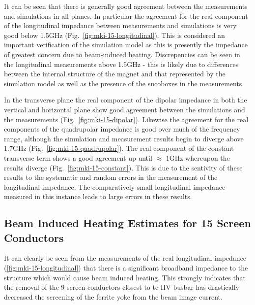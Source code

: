 It can be seen that there is generally good agreement between the measurements and simulations in all planes. In particular the agreement for the real component of the longitudinal impedance between measurements and simulations is very good below 1.5GHz (Fig.~\ref{fig:mki-15-longitudinal}). This is considered an important verification of the simulation model as this is presently the impedance of greatest concern due to beam-induced heating. Discrepencies can be seen in the longitudinal measurements above 1.5GHz - this is likely due to differences between the internal structure of the magnet and that represented by the simulation model as well as the presence of the sucoboxes in the measurements.

In the transverse plane the real component of the dipolar impedance in both the vertical and horizontal plane show good agreement between the simulations and the measurements (Fig.~\ref{fig:mki-15-dipolar}). Likewise the agreement for the real components of the quadrupolar impedance is good over much of the frequency range, although the simulation and measurement results begin to diverge above 1.7GHz (Fig.~\ref{fig:mki-15-quadrupolar}). The real component of the constant transverse term shows a good agreement up until $\approx$ 1GHz whereupon the results diverge (Fig.~\ref{fig:mki-15-constant}). This is due to the sentivity of these results to the systematic and random errors in the measurement of the longitudinal impedance. The comparatively small longitudinal impedance measured in this instance leads to large errors in these results. 

\subsection{Beam Induced Heating Estimates for 15 Screen Conductors}

It can clearly be seen from the measurements of the real longitudinal impedance (\ref{fig:mki-15-longitudinal}) that there is a significant broadband impedance to the structure which would cause beam induced heating. This strongly indicates that the removal of the 9 screen conductors closest to te HV busbar has drastically decreased the screening of the ferrite yoke from the beam image current.

